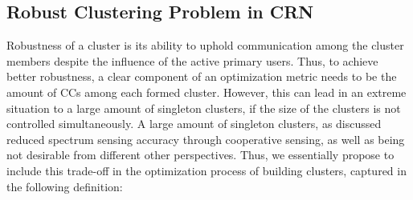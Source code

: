 \documentclass[times]{ettauth}
\newcommand{\ie}{i.e., }
\theoremstyle{mytheoremstyle}
\theoremstyle{mytheoremstyle}
\theoremstyle{mytheoremstyle}
\begin{document}
\subsection{Robust Clustering Problem in CRN}
\label{problem}


Robustness of a cluster is its ability to uphold communication among the cluster members despite the influence of the active primary users.
Thus, to achieve better robustness, a clear component of an optimization metric needs to be the amount of CCs among each formed cluster. 
However, this can lead in an extreme situation to a large amount of singleton clusters, if the size of the clusters is not controlled simultaneously. 
A large amount of singleton clusters, as discussed reduced spectrum sensing accuracy through cooperative sensing, as well as being not desirable from different other perspectives.
Thus, we essentially propose to include this trade-off in the optimization process of building clusters, captured in the following definition:
\end{document}
